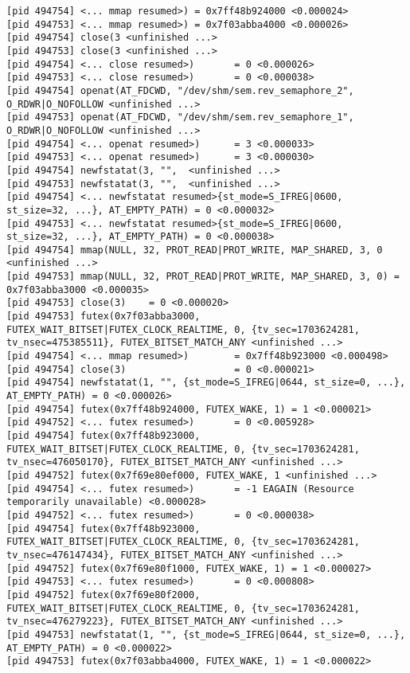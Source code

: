 \documentclass[a4paper, 12pt]{article}
\begin{document}
\begin{lstlisting}
[pid 494754] <... mmap resumed>) = 0x7ff48b924000 <0.000024>
[pid 494753] <... mmap resumed>) = 0x7f03abba4000 <0.000026>
[pid 494754] close(3 <unfinished ...>
[pid 494753] close(3 <unfinished ...>
[pid 494754] <... close resumed>)       = 0 <0.000026>
[pid 494753] <... close resumed>)       = 0 <0.000038>
[pid 494754] openat(AT_FDCWD, "/dev/shm/sem.rev_semaphore_2", O_RDWR|O_NOFOLLOW <unfinished ...>
[pid 494753] openat(AT_FDCWD, "/dev/shm/sem.rev_semaphore_1", O_RDWR|O_NOFOLLOW <unfinished ...>
[pid 494754] <... openat resumed>)      = 3 <0.000033>
[pid 494753] <... openat resumed>)      = 3 <0.000030>
[pid 494754] newfstatat(3, "",  <unfinished ...>
[pid 494753] newfstatat(3, "",  <unfinished ...>
[pid 494754] <... newfstatat resumed>{st_mode=S_IFREG|0600, st_size=32, ...}, AT_EMPTY_PATH) = 0 <0.000032>
[pid 494753] <... newfstatat resumed>{st_mode=S_IFREG|0600, st_size=32, ...}, AT_EMPTY_PATH) = 0 <0.000038>
[pid 494754] mmap(NULL, 32, PROT_READ|PROT_WRITE, MAP_SHARED, 3, 0 <unfinished ...>
[pid 494753] mmap(NULL, 32, PROT_READ|PROT_WRITE, MAP_SHARED, 3, 0) = 0x7f03abba3000 <0.000035>
[pid 494753] close(3)    = 0 <0.000020>
[pid 494753] futex(0x7f03abba3000, FUTEX_WAIT_BITSET|FUTEX_CLOCK_REALTIME, 0, {tv_sec=1703624281, tv_nsec=475385511}, FUTEX_BITSET_MATCH_ANY <unfinished ...>
[pid 494754] <... mmap resumed>)        = 0x7ff48b923000 <0.000498>
[pid 494754] close(3)                   = 0 <0.000021>
[pid 494754] newfstatat(1, "", {st_mode=S_IFREG|0644, st_size=0, ...}, AT_EMPTY_PATH) = 0 <0.000026>
[pid 494754] futex(0x7ff48b924000, FUTEX_WAKE, 1) = 1 <0.000021>
[pid 494752] <... futex resumed>)       = 0 <0.005928>
[pid 494754] futex(0x7ff48b923000, FUTEX_WAIT_BITSET|FUTEX_CLOCK_REALTIME, 0, {tv_sec=1703624281, tv_nsec=476050170}, FUTEX_BITSET_MATCH_ANY <unfinished ...>
[pid 494752] futex(0x7f69e80ef000, FUTEX_WAKE, 1 <unfinished ...>
[pid 494754] <... futex resumed>)       = -1 EAGAIN (Resource temporarily unavailable) <0.000028>
[pid 494752] <... futex resumed>)       = 0 <0.000038>
[pid 494754] futex(0x7ff48b923000, FUTEX_WAIT_BITSET|FUTEX_CLOCK_REALTIME, 0, {tv_sec=1703624281, tv_nsec=476147434}, FUTEX_BITSET_MATCH_ANY <unfinished ...>
[pid 494752] futex(0x7f69e80f1000, FUTEX_WAKE, 1) = 1 <0.000027>
[pid 494753] <... futex resumed>)       = 0 <0.000808>
[pid 494752] futex(0x7f69e80f2000, FUTEX_WAIT_BITSET|FUTEX_CLOCK_REALTIME, 0, {tv_sec=1703624281, tv_nsec=476279223}, FUTEX_BITSET_MATCH_ANY <unfinished ...>
[pid 494753] newfstatat(1, "", {st_mode=S_IFREG|0644, st_size=0, ...}, AT_EMPTY_PATH) = 0 <0.000022>
[pid 494753] futex(0x7f03abba4000, FUTEX_WAKE, 1) = 1 <0.000022>

\end{lstlisting}
\end{document}
